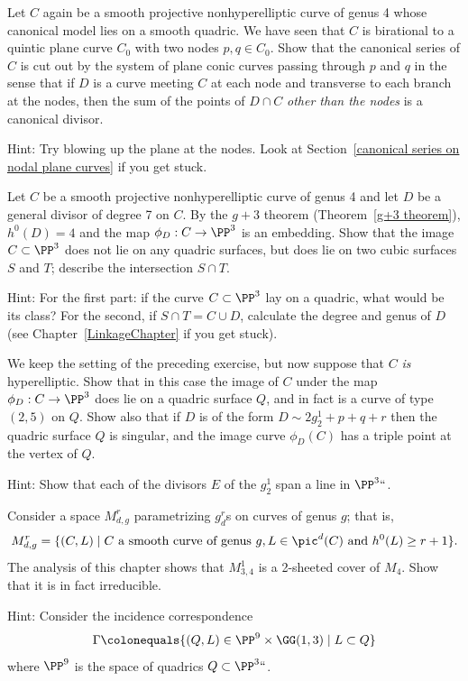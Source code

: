 \begin{exercise}\label{ex7.2}
Let $C$ again be a smooth projective nonhyperelliptic curve of genus 4
whose canonical model lies on a smooth quadric. We have seen that $C$ is
birational
%
%
to a
quintic plane curve
%
$C_0$ with two nodes $p, q \in
C_0$. Show that the canonical series of $C$ is cut out by the system
of plane conic curves passing through $p$ and $q$ in the sense
that if $D$ is a curve meeting $C$ at each node and transverse to each
branch at the nodes, then
the sum of the points of $D\cap C$ \emph{other than the nodes} is a canonical divisor.

Hint: Try
blowing up
%
the plane at the nodes. Look at
Section~\ref{canonical series on nodal plane curves} if you get stuck.
\end{exercise}

\begin{exercise}\label{ex7.3}
Let $C$  be a smooth projective nonhyperelliptic curve of genus 4 and
let $D$ be a general divisor of degree 7 on $C$. By the
$g+3$ theorem
%
(Theorem~\ref{g+3 theorem}), $h^0(D) = 4$ and the map $\phi_D : C \to
\PP^3$ is an embedding. Show that the image $C \subset \PP^3$ does not
lie on any quadric surfaces, but does lie on two cubic surfaces $S$
and $T$; describe the intersection $S \cap T$.

Hint: For the first part: if the curve $C \subset \PP^3$ lay on a quadric, what would be its class? For the second, if $S \cap T = C \cup D$, calculate the degree and genus of $D$ (see Chapter~\ref{LinkageChapter} if you get stuck).
\end{exercise}

\begin{exercise}\label{ex7.4}
We keep
the setting of the preceding exercise,
but now
suppose that $C$ \emph{is} hyperelliptic. Show that in this case the
image of $C$ under the map $\phi_D : C \to \PP^3$ does lie on a
quadric surface $Q$, and in fact is a curve of type $(2,5)$ on $Q$.
Show also that if $D$ is of the form $D \sim 2g^1_2 + p + q + r$ then
the quadric surface $Q$ is singular, and the image curve $\phi_D(C)$
has a triple point at the vertex of $Q$.

Hint: Show that each of the divisors $E$ of the $g^1_2$ span a line in $\PP^3` `$.
 \end{exercise}

\begin{exercise}\label{ex7.5}
Consider a space $M^r_{d,g}$ parametrizing $g^r_d$s on curves of genus $g$; that is,
$$
M^r_{d,g} = \{ (C, L) \mid C \text{ a smooth curve of genus } g, L \in \pic^d(C) \text{ and } h^0(L) \geq r+1 \}.
$$
The analysis of this chapter shows that
$M^1_{3,4}$
%
is a
2-sheeted cover of $M_4$.
%
Show that it is in fact irreducible.

Hint: Consider the incidence correspondence
$$
\Gamma \colonequals  \{ (Q, L) \in \PP^9 \times \GG(1,3) \mid L \subset Q \}
$$
where $\PP^9$ is the space of quadrics $Q\subset \PP^3` `$.
\end{exercise}

